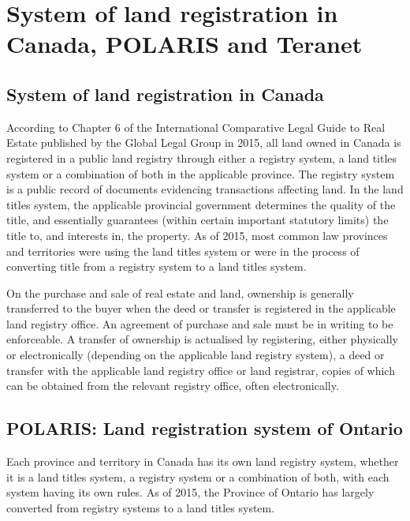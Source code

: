 \section{System of land registration in Canada, POLARIS and Teranet} \label{sec:system_of_land_registration_polaris_teranet}

\subsection{System of land registration in Canada} \label{subsec:land_reg_system_canada}

According to Chapter 6 of the International Comparative Legal Guide to Real Estate published by the Global Legal Group in 2015\cite{McKean2015}, all land owned in Canada is registered in a public land registry through either a registry system, a land titles system or a combination of both in the applicable province.
The registry system is a public record of documents evidencing transactions affecting land.
In the land titles system, the applicable provincial government determines the quality of the title, and essentially guarantees (within certain important statutory limits) the title to, and interests in, the property.
As of 2015, most common law provinces and territories were using the land titles system or were in the process of converting title from a registry system to a land titles system.

On the purchase and sale of real estate and land, ownership is generally transferred to the buyer when the deed or transfer is registered in the applicable land registry office.
An agreement of purchase and sale must be in writing to be enforceable.
A transfer of ownership is actualised by registering, either physically or electronically (depending on the applicable land registry system), a deed or transfer with the applicable land registry office or land registrar, copies of which can be obtained from the relevant registry office, often electronically.

\subsection{POLARIS: Land registration system of Ontario} \label{subsec:lang_reg_operating_canada}

Each province and territory in Canada has its own land registry system, whether it is a land titles system, a registry system or a combination of both, with each system having its own rules.
As of 2015, the Province of Ontario has largely converted from registry systems to a land titles system.

